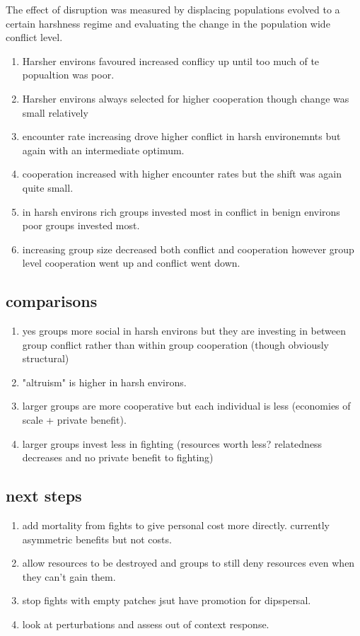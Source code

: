 The effect of disruption was measured by displacing populations evolved to a certain harshness regime and evaluating the change in the population wide conflict level. 

\begin{enumerate}
    \item Harsher environs favoured increased conflicy up until too much of te popualtion was poor.
    \item Harsher environs always selected for higher cooperation though change was small relatively 
    \item encounter rate increasing drove higher conflict in harsh environemnts but again with an intermediate optimum. 
    \item cooperation increased with higher encounter rates but the shift was again quite small.
    \item in harsh environs rich groups invested most in conflict in benign environs poor groups invested most. 
    \item increasing group size decreased both conflict and cooperation however group level cooperation went up and conflict went down. 
\end{enumerate}

\subsection{comparisons} 
\begin{enumerate}
    \item yes groups more social in harsh environs but they are investing in between group conflict rather than within group cooperation (though obviously structural)
    \item "altruism" is higher in harsh environs.
    \item larger groups are more cooperative but each individual is less (economies of scale + private benefit).
    \item larger groups invest less in fighting (resources worth less? relatedness decreases and no private benefit to fighting)
\end{enumerate}

\subsection{next steps}
\begin{enumerate}
    \item add mortality from fights to give personal cost more directly. currently asymmetric benefits but not costs.
    \item allow resources to be destroyed and groups to still deny resources even when they can't gain them.
    \item stop fights with empty patches jsut have promotion for dipspersal.
    \item look at perturbations and assess out of context response. 
\end{enumerate}